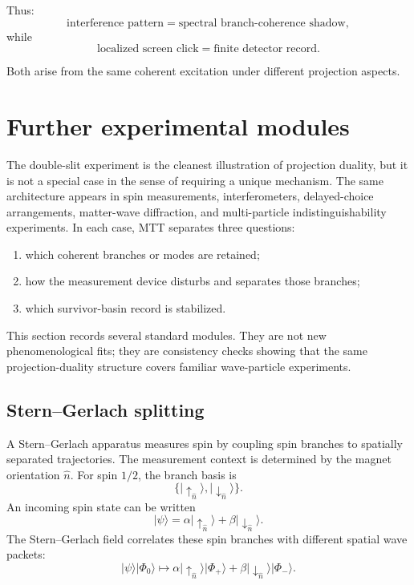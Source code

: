 \documentclass[11pt]{article}
\begin{document}
Thus:
\begin{equation}
  \boxed{
  \text{interference pattern}
  =
  \text{spectral branch-coherence shadow},
  }
\end{equation}
while
\begin{equation}
  \boxed{
  \text{localized screen click}
  =
  \text{finite detector record}.
  }
\end{equation}

Both arise from the same coherent excitation under different projection aspects.
\section{Further experimental modules}
\label{sec:further-experiments}

The double-slit experiment is the cleanest illustration of projection duality, but it is not a
special case in the sense of requiring a unique mechanism. The same architecture appears in
spin measurements, interferometers, delayed-choice arrangements, matter-wave diffraction,
and multi-particle indistinguishability experiments. In each case, MTT separates three
questions:
\begin{enumerate}[label=(\roman*)]
  \item which coherent branches or modes are retained;
  \item how the measurement device disturbs and separates those branches;
  \item which survivor-basin record is stabilized.
\end{enumerate}
This section records several standard modules. They are not new phenomenological fits; they
are consistency checks showing that the same projection-duality structure covers familiar
wave-particle experiments.

\subsection{Stern--Gerlach splitting}
\label{subsec:stern-gerlach}

A Stern--Gerlach apparatus measures spin by coupling spin branches to spatially separated
trajectories. The measurement context is determined by the magnet orientation \(\hat n\).
For spin \(1/2\), the branch basis is
\begin{equation}
  \{|\uparrow_{\hat n}\rangle,|\downarrow_{\hat n}\rangle\}.
\end{equation}
An incoming spin state can be written
\begin{equation}
  |\psi\rangle
  =
  \alpha|\uparrow_{\hat n}\rangle
  +
  \beta|\downarrow_{\hat n}\rangle.
  \label{eq:sg-incoming}
\end{equation}
The Stern--Gerlach field correlates these spin branches with different spatial wave packets:
\begin{equation}
  |\psi\rangle|\Phi_0\rangle
  \longmapsto
  \alpha|\uparrow_{\hat n}\rangle|\Phi_+\rangle
  +
  \beta|\downarrow_{\hat n}\rangle|\Phi_-\rangle.
  \label{eq:sg-branch-correlation}
\end{equation}
\end{document}
